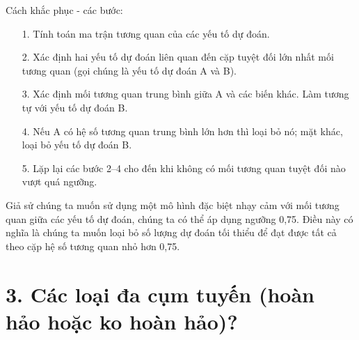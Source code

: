 \documentclass[a4paper,12pt]{article}
\begin{document}
Cách khắc phục - các bước:
\begin{itemize}
    \item[1.] Tính toán ma trận tương quan của các yếu tố dự đoán.
    \item[2.] Xác định hai yếu tố dự đoán liên quan đến cặp tuyệt đối lớn nhất
mối tương quan (gọi chúng là yếu tố dự đoán A và B).
    \item[3.] Xác định mối tương quan trung bình giữa A và các biến khác.
Làm tương tự với yếu tố dự đoán B.
    \item[4.] Nếu A có hệ số tương quan trung bình lớn hơn thì loại bỏ nó; mặt khác, loại bỏ yếu tố dự đoán B.
    \item[5.] Lặp lại các bước 2–4 cho đến khi không có mối tương quan tuyệt đối nào vượt quá ngưỡng.
\end{itemize}

Giả sử chúng ta muốn sử dụng một mô hình đặc biệt nhạy cảm với mối tương quan giữa các yếu tố dự đoán, chúng ta có thể áp dụng ngưỡng 0,75. Điều này có nghĩa là chúng ta
muốn loại bỏ số lượng dự đoán tối thiểu để đạt được tất cả theo cặp
hệ số tương quan nhỏ hơn 0,75.

\section* {3. Các loại đa cụm tuyến (hoàn hảo hoặc ko hoàn hảo)?\\}
\end{document}
